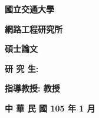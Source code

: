 \begin{minipage}{\linewidth}
\end{minipage}

\vspace{2cm}

\begin{center}
	\begin{minipage}{\linewidth}
    \thispagestyle{empty} %
    \centering
    
	\textbf{{\fontsize{44}{54}\selectfont 國立交通大學}}\par
	\vspace{1cm}
	\textbf{{\fontsize{30}{40}\selectfont 網路工程研究所}}\par
	\vspace{1.5cm}
	\textbf{{\fontsize{26}{36}\selectfont 碩士論文}}\par
	\vspace{3cm}
    {\fontsize{22}{32}\selectfont \TitleChinese\par}
    \vspace{2cm}
    {\fontsize{18}{28}\selectfont \TitleEnglish\par}
    \vspace{1cm}
	
	\begin{flushleft}
		\textbf{{\fontsize{24}{34}\selectfont 研 究 生: \StudentNameChinese}}\par
		\textbf{{\fontsize{24}{34}\selectfont 指導教授: \AdvisorNameChinese  教授}}\par
	\end{flushleft}
	
    
    
	\end{minipage}
\end{center}

\vfill

\begin{center}
	\begin{minipage}{\linewidth}
    \thispagestyle{empty} %
       \centering
    \textbf{{\Huge 中 華 民 國 105 年 1 月}}\par
    
	\end{minipage}
\end{center}